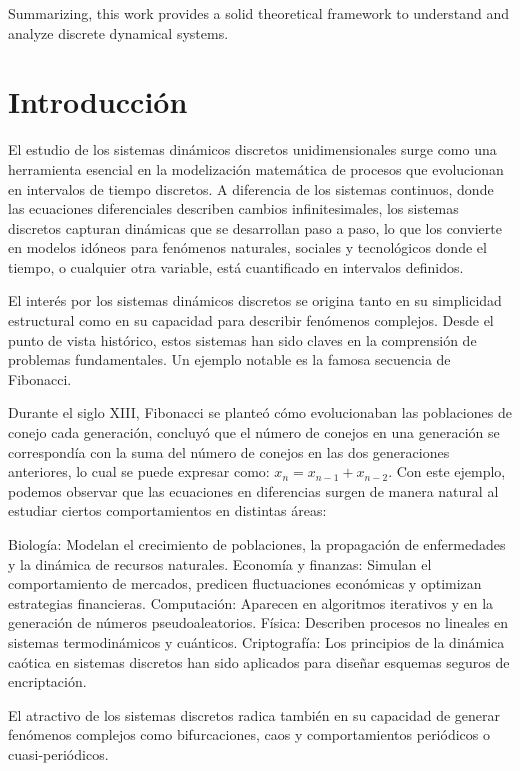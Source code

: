 \documentclass[12pt,a4paper]{report}
\theoremstyle{definition}
\begin{document}
Summarizing, this work provides a solid theoretical framework to understand and analyze discrete dynamical systems.

\chapter*{Introducción}

El estudio de los sistemas dinámicos discretos unidimensionales surge como una herramienta esencial en la modelización matemática de procesos que evolucionan en intervalos de tiempo discretos. A diferencia de los sistemas continuos, donde las ecuaciones diferenciales describen cambios infinitesimales, los sistemas discretos capturan dinámicas que se desarrollan paso a paso, lo que los convierte en modelos idóneos para fenómenos naturales, sociales y tecnológicos donde el tiempo, o cualquier otra variable, está cuantificado en intervalos definidos.

El interés por los sistemas dinámicos discretos se origina tanto en su simplicidad estructural como en su capacidad para describir fenómenos complejos. Desde el punto de vista histórico, estos sistemas han sido claves en la comprensión de problemas fundamentales. Un ejemplo notable es la famosa secuencia de Fibonacci. 

Durante el siglo XIII, Fibonacci se planteó cómo evolucionaban las poblaciones de conejo cada generación, concluyó que el número de conejos en una generación se correspondía con la suma del número de conejos en las dos generaciones anteriores, lo cual se puede expresar como: $x_n = x_{n-1} + x_{n-2}$. Con este ejemplo, podemos observar que las ecuaciones en diferencias surgen de manera natural al estudiar ciertos comportamientos en distintas áreas:

Biología: Modelan el crecimiento de poblaciones, la propagación de enfermedades y la dinámica de recursos naturales.
Economía y finanzas: Simulan el comportamiento de mercados, predicen fluctuaciones económicas y optimizan estrategias financieras.
Computación: Aparecen en algoritmos iterativos y en la generación de números pseudoaleatorios.
Física: Describen procesos no lineales en sistemas termodinámicos y cuánticos.
Criptografía: Los principios de la dinámica caótica en sistemas discretos han sido aplicados para diseñar esquemas seguros de encriptación.

El atractivo de los sistemas discretos radica también en su capacidad de generar fenómenos complejos como bifurcaciones, caos y comportamientos periódicos o cuasi-periódicos.
\end{document}
